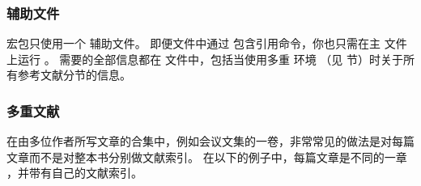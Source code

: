 \subsubsection{辅助文件}%
\label{use:use:aux}


\biblatex 宏包只使用一个  辅助文件。
即便文件中通过  包含引用命令，你也只需在主  文件上运行 \biber 。
\biber 需要的全部信息都在  文件中，包括当使用多重  环境
（见  节）时关于所有参考文献分节的信息。

\subsubsection{多重文献}%
\label{use:use:mlt}


在由多位作者所写文章的合集中，例如会议文集的一卷，非常常见的做法是对每篇文章而不是对整本书分别做文献索引。
在以下的例子中，每篇文章是不同的一章 ，并带有自己的文献索引。

